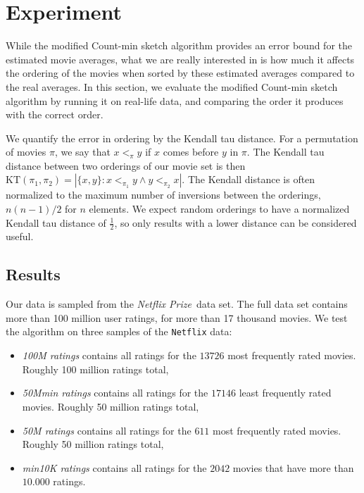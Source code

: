\section{Experiment}
While the modified Count-min sketch algorithm provides an error bound for the
estimated movie averages, what we are really interested in is how much it
affects the ordering of the movies when sorted by these estimated averages
compared to the real averages. In this section, we evaluate the modified
Count-min sketch algorithm by running it on real-life data, and comparing the
order it produces with the correct order. 

We quantify the error in ordering by the Kendall tau distance. For a permutation
of movies $\pi$, we say that $x <_\pi y$ if $x$ comes before $y$ in $\pi$. The
Kendall tau distance between two orderings of our movie set is then $\mathrm{KT}
\left(\pi_1,\pi_2\right) = \left|\{x,y\}: x <_{\pi_1} y \wedge y <_{\pi_2}
x\right|$. The Kendall distance is often normalized to the maximum number of
inversions between the orderings, $n(n-1)/2$ for $n$ elements. We expect random
orderings to have a normalized Kendall tau distance of $\frac{1}{2}$, so
only results with a lower distance can be considered useful.

\subsection{Results}
Our data is sampled from the \textit{Netflix
Prize}\footnotemark \ data set.
The full data set contains more than 100 million user ratings, for more than 17
thousand movies.
We test the algorithm on three samples of the \texttt{Netflix} data:

\begin{itemize}
	\item \textit{100M ratings} contains all ratings for the $13726$ most
		frequently rated movies. Roughly 100 million ratings total,
	\item \textit{50Mmin ratings} contains all ratings for the $17146$ least
		frequently rated movies. Roughly 50 million ratings total,
	\item \textit{50M ratings} contains all ratings for the $611$ most
		frequently rated movies. Roughly 50 million ratings total,
	\item \textit{min10K ratings} contains all ratings for the $2042$ movies that have more
		than $10.000$ ratings.

\end{itemize}

